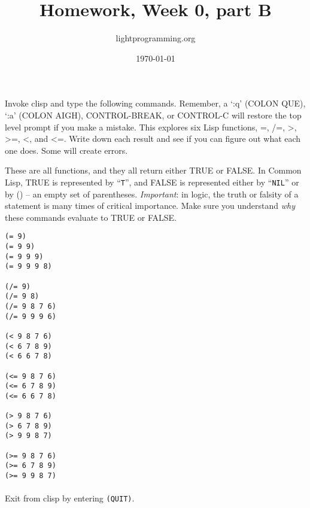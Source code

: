 \documentclass{article}
\title{Homework, Week 0, part B}
\author{lightprogramming.org}
\date{\today}
\begin{document}
\maketitle{}
\lstset{language=Lisp}

Invoke clisp and type the following commands. Remember, a `:q' (COLON QUE), `:a' (COLON AIGH), CONTROL-BREAK, or CONTROL-C will restore the top level prompt if you make a mistake. This explores six Lisp functions, =, /=, \textgreater, \textgreater=, \textless, and \textless=. Write down each result and see if you can figure out what each one does. Some will create errors.

These are all functions, and they all return either TRUE or FALSE. In Common Lisp, TRUE is represented by ``\texttt{T}'', and FALSE is represented either by ``\texttt{NIL}'' or by () -- an empty set of parentheses. \textit{Important}: in logic, the truth or falsity of a statement is many times of critical importance. Make sure you understand \textit{why} these commands evaluate to TRUE or FALSE.


\begin{multicols}{2}
\begin{lstlisting}
(= 9)
(= 9 9)
(= 9 9 9)
(= 9 9 9 8)

(/= 9)
(/= 9 8)
(/= 9 8 7 6)
(/= 9 9 9 6)

(< 9 8 7 6)
(< 6 7 8 9)
(< 6 6 7 8)

(<= 9 8 7 6)
(<= 6 7 8 9)
(<= 6 6 7 8)

(> 9 8 7 6)
(> 6 7 8 9)
(> 9 9 8 7)

(>= 9 8 7 6)
(>= 6 7 8 9)
(>= 9 9 8 7)
\end{lstlisting}
\end{multicols}

\paragraph{} Exit from clisp by entering \texttt{(QUIT)}.
\end{document}
